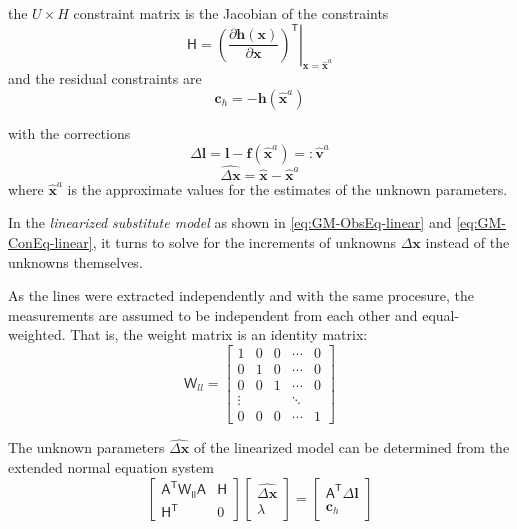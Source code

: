 the $U\times H$ constraint matrix is the Jacobian of the constraints
\begin{equation*}
\mathsf{H}=\left.\left(\dfrac{\partial\boldsymbol h(\boldsymbol x)}{\partial\boldsymbol x}\right)^\mathsf{T}\right|_{\boldsymbol x=\widehat{\boldsymbol x}^a}
\end{equation*}
and the residual constraints are %
\begin{equation*}
\boldsymbol c_h=-\boldsymbol h(\widehat{\boldsymbol x}^a)
\end{equation*}

with the corrections
\begin{equation} \label{eq:GM-ObsEq-linear-l}
\Delta\boldsymbol l=\boldsymbol l-\boldsymbol f(\widehat{\boldsymbol x}^a)=:\widehat{\boldsymbol v}^a
\end{equation}
\begin{equation} \label{eq:GM-ObsEq-linear-x}
\widehat{\Delta\boldsymbol x}=\widehat{\boldsymbol x}-\widehat{\boldsymbol x}^a
\end{equation}
where $\widehat{\boldsymbol x}^a$ is the approximate values for the estimates of the unknown parameters.

In the \textit{linearized substitute model} as shown in \eqref{eq:GM-ObsEq-linear} and \eqref{eq:GM-ConEq-linear}, it turns to solve for the increments of unknowns $\Delta\boldsymbol x$ instead of the unknowns themselves.

As the lines were extracted independently and with the same procesure, the measurements are assumed to be independent from each other and equal-weighted. That is, the weight matrix is an identity matrix:
\begin{equation}
\mathsf{W}_{ll}=
\begin{bmatrix}
1&0&0&\cdots &0\\
0&1&0&\cdots &0\\
0&0&1&\cdots &0\\
\vdots&&&\ddots&\\
0&0&0&\cdots &1
\end{bmatrix}
\end{equation}


The unknown parameters $\widehat{\Delta\boldsymbol x}$ of the linearized model can be determined from the extended normal equation system
\begin{equation}
\begin{bmatrix}
\mathsf{A^T\mathsf{W}_{ll}A} & \mathsf{H}\\
\mathsf{H^T} & 0
\end{bmatrix}
\begin{bmatrix}
\widehat{\Delta\boldsymbol x}\\
\lambda
\end{bmatrix}
=
\begin{bmatrix}
\mathsf{A^T}\Delta\boldsymbol l\\
\boldsymbol c_h
\end{bmatrix}
\end{equation}

